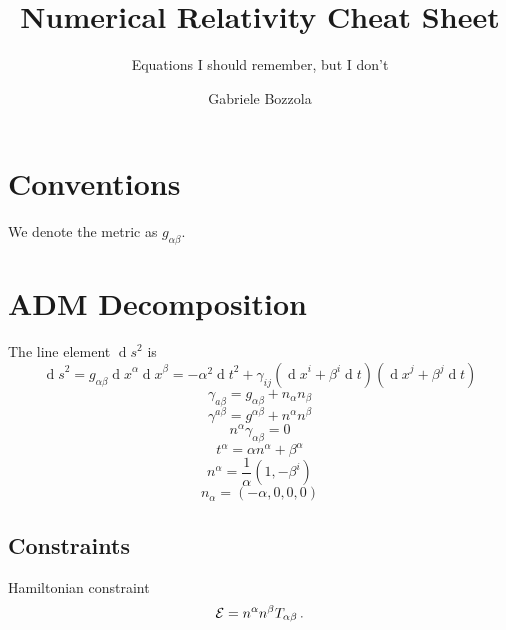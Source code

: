 \documentclass[]{scrartcl}
\author{Gabriele Bozzola}
\title{Numerical Relativity Cheat Sheet}
\date{}
\subtitle{Equations I should remember, but I don't}
\renewcommand{\d}[1]{\ensuremath{\operatorname{d}\!{#1}}}
\begin{document}
\maketitle
\tableofcontents

\section{Conventions}
\label{sec:conventions}

We denote the metric as $g_{\alpha\beta}$.

\section{ADM Decomposition}
\label{sec:adm-decomposition}

The line element $\d s^2$ is
\begin{equation}
  \label{eq:2}
  \d s^2 = g_{\alpha\beta} \d x^\alpha \d x^\beta = - \alpha^2 \d t^2 + \gamma_{ij} (\d x^i + \beta^i \d t) (\d x^j + \beta^j \d t)
\end{equation}
\begin{equation}
  \label{eq:11}
  \gamma_{a\beta} = g_{\alpha\beta} + n_\alpha n_\beta
\end{equation}
\begin{equation}
  \label{eq:11}
  \gamma^{a\beta} = g^{\alpha\beta} + n^\alpha n^\beta
\end{equation}
\begin{equation}
  \label{eq:12}
  n^\alpha \gamma_{\alpha\beta} = 0
\end{equation}
\begin{equation}
  \label{eq:16}
  t^\alpha = \alpha n^\alpha + \beta^\alpha
\end{equation}
\begin{equation}
  \label{eq:4}
  n^\alpha = \frac{1}{\alpha} (1, - \beta^i)
\end{equation}
\begin{equation}
  \label{eq:5}
  n_\alpha = (-\alpha,0,0,0)
\end{equation}

\subsection{Constraints}
\label{sec:constraints}

Hamiltonian constraint
\begin{equation}
  \label{eq:18}
  {\cal E} = n^\alpha n^\beta T_{\alpha\beta}\,.
\end{equation}
\end{document}
